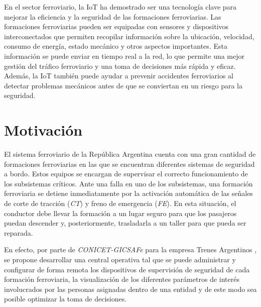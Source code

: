 En el sector ferroviario, la IoT ha demostrado ser una tecnología clave para mejorar la eficiencia y la seguridad de las formaciones ferroviarias. Las formaciones ferroviarias pueden ser equipadas con sensores y dispositivos interconectados que permiten recopilar información sobre la ubicación, velocidad, consumo de energía, estado mecánico y otros aspectos importantes. Esta información se puede enviar en tiempo real a la red, lo que permite una mejor gestión del tráfico ferroviario y una toma de decisiones más rápida y eficaz. Además, la IoT también puede ayudar a prevenir accidentes ferroviarios al detectar problemas mecánicos antes de que se conviertan en un riesgo para la seguridad.


%

\newpage
\section{Motivación}

El sistema ferroviario de la República Argentina cuenta con una gran cantidad de formaciones ferroviarias en las que se encuentran diferentes sistemas de seguridad a bordo. Estos equipos se encargan de supervisar el correcto funcionamiento de los subsistemas críticos. Ante una falla en uno de los subsistemas, una formación ferroviaria se detiene inmediatamente por la activación automática de las señales de corte de tracción (\textit{CT}) y freno de emergencia (\textit{FE}). En esta situación, el conductor debe llevar la formación a un lugar seguro para que los pasajeros puedan descender y, posteriormente, trasladarla a un taller para que pueda ser reparada.

En efecto, por parte de \textit{CONICET-GICSAFe} \citep{gicsafe} para la empresa Trenes Argentinos \citep{trenes-argentinos}, se propone desarrollar una central operativa tal que se puede administrar y configurar de forma remota los dispositivos de supervisión de seguridad de cada formación ferroviaria, la visualización de los diferentes parámetros de interés involucrados por las personas asignadas dentro de una entidad y de este modo sea posible optimizar la toma de decisiones.


